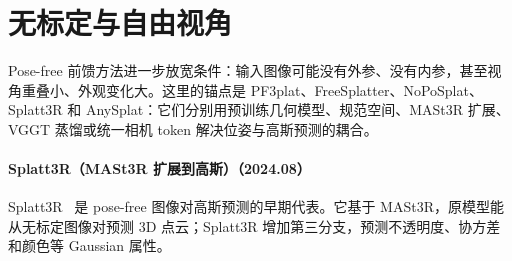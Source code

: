 \section{无标定与自由视角}

Pose-free 前馈方法进一步放宽条件：输入图像可能没有外参、没有内参，甚至视角重叠小、外观变化大。这里的锚点是 PF3plat、FreeSplatter、NoPoSplat、Splatt3R 和 AnySplat：它们分别用预训练几何模型、规范空间、MASt3R 扩展、VGGT 蒸馏或统一相机 token 解决位姿与高斯预测的耦合。
\paragraph{Splatt3R（MASt3R 扩展到高斯）（2024.08）}
Splatt3R~\cite{2408_13912} 是 pose-free 图像对高斯预测的早期代表。它基于 MASt3R，原模型能从无标定图像对预测 3D 点云；Splatt3R 增加第三分支，预测不透明度、协方差和颜色等 Gaussian 属性。

